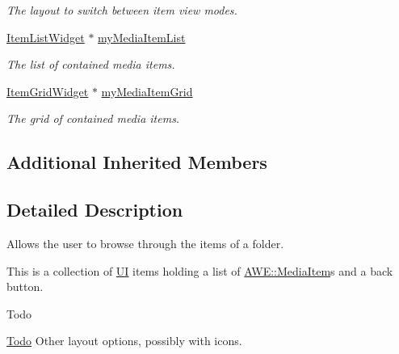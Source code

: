 \begin{DoxyCompactItemize}
\begin{DoxyCompactList}\small\item\em The layout to switch between item view modes. \end{DoxyCompactList}\item 
\hypertarget{class_u_i_1_1_folder_pane_a04b1e341431f6fc15c5376dd742ef554}{\hyperlink{class_u_i_1_1_item_list_widget}{Item\-List\-Widget} $\ast$ \hyperlink{class_u_i_1_1_folder_pane_a04b1e341431f6fc15c5376dd742ef554}{my\-Media\-Item\-List}}\label{class_u_i_1_1_folder_pane_a04b1e341431f6fc15c5376dd742ef554}

\begin{DoxyCompactList}\small\item\em The list of contained media items. \end{DoxyCompactList}\item 
\hypertarget{class_u_i_1_1_folder_pane_a35113c49ae546f179ac3609c9ef76321}{\hyperlink{class_u_i_1_1_item_grid_widget}{Item\-Grid\-Widget} $\ast$ \hyperlink{class_u_i_1_1_folder_pane_a35113c49ae546f179ac3609c9ef76321}{my\-Media\-Item\-Grid}}\label{class_u_i_1_1_folder_pane_a35113c49ae546f179ac3609c9ef76321}

\begin{DoxyCompactList}\small\item\em The grid of contained media items. \end{DoxyCompactList}\end{DoxyCompactItemize}
\subsection*{Additional Inherited Members}


\subsection{Detailed Description}
Allows the user to browse through the items of a folder. 

This is a collection of \hyperlink{namespace_u_i}{U\-I} items holding a list of {\ttfamily \hyperlink{class_a_w_e_1_1_media_item}{A\-W\-E\-::\-Media\-Item}}s and a back button.

\begin{DoxyRefDesc}{Todo}
\item[\hyperlink{todo__todo000010}{Todo}]Other layout options, possibly with icons. \end{DoxyRefDesc}


